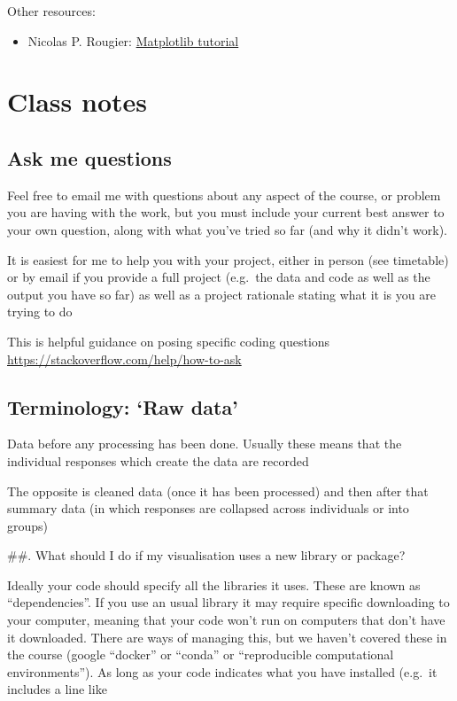\documentclass[
]{book}
\providecommand{\tightlist}{%
  \setlength{\itemsep}{0pt}\setlength{\parskip}{0pt}}
\begin{document}
Other resources:

\begin{itemize}
\tightlist
\item
  Nicolas P. Rougier: \href{https://github.com/rougier/matplotlib-tutorial}{Matplotlib tutorial}
\end{itemize}

\hypertarget{appendix-appendices}{%
\appendix {}}


\hypertarget{class-notes}{%
\chapter{Class notes}\label{class-notes}}

\hypertarget{ask-me-questions}{%
\section{Ask me questions}\label{ask-me-questions}}

Feel free to email me with questions about any aspect of the course, or problem you are having with the work, but you must include your current best answer to your own question, along with what you've tried so far (and why it didn't work).

It is easiest for me to help you with your project, either in person (see timetable) or by email if you provide a full project (e.g.~the data and code as well as the output you have so far) as well as a project rationale stating what it is you are trying to do

This is helpful guidance on posing specific coding questions \url{https://stackoverflow.com/help/how-to-ask}

\hypertarget{terminology-raw-data}{%
\section{Terminology: `Raw data'}\label{terminology-raw-data}}

Data before any processing has been done. Usually these means that the individual responses which create the data are recorded

The opposite is cleaned data (once it has been processed) and then after that summary data (in which responses are collapsed across individuals or into groups)

\#\#. What should I do if my visualisation uses a new library or package?

Ideally your code should specify all the libraries it uses. These are known as ``dependencies''. If you use an usual library it may require specific downloading to your computer, meaning that your code won't run on computers that don't have it downloaded. There are ways of managing this, but we haven't covered these in the course (google ``docker'' or ``conda'' or ``reproducible computational environments''). As long as your code indicates what you have installed (e.g.~it includes a line like
\end{document}
